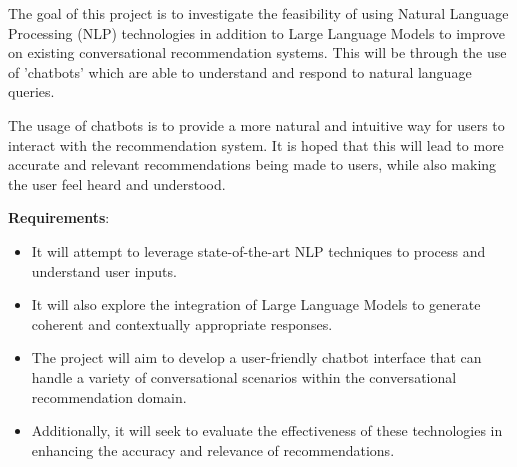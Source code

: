 
The goal of this project is to investigate the feasibility of using Natural Language Processing (NLP) technologies in addition to Large Language Models to improve on existing conversational recommendation systems. 
This will be through the use of 'chatbots' which are able to understand and respond to natural language queries. 

The usage of chatbots is to provide a more natural and intuitive way for users to interact with the recommendation system. 
It is hoped that this will lead to more accurate and relevant recommendations being made to users, while also making the user feel heard and understood.

\textbf{Requirements}:
\begin{itemize}
    \item It will attempt to leverage state-of-the-art NLP techniques to process and understand user inputs.
    \item It will also explore the integration of Large Language Models to generate coherent and contextually appropriate responses.
    \item The project will aim to develop a user-friendly chatbot interface that can handle a variety of conversational scenarios within the conversational recommendation domain.
    \item Additionally, it will seek to evaluate the effectiveness of these technologies in enhancing the accuracy and relevance of recommendations.
\end{itemize}




